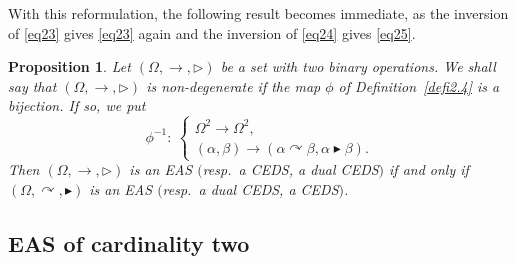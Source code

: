 \documentclass[10pt,a4paper]{amsart}
\numberwithin{equation}{section}
\newtheorem{Proposition}[Theorem]{Proposition}
 { \theoremstyle{definition}
\newtheorem{Definition}[Theorem]{Definition}
\newtheorem{Note}[Theorem]{Note}
\newtheorem{Example}[Theorem]{Example}
\newtheorem{Remark}[Theorem]{Remark}
\newtheorem{Notation}[Theorem]{Notation}}
\begin{document}
With this reformulation, the following result becomes immediate, as the
inversion of \eqref{eq23} gives \eqref{eq23} again and the inversion of \eqref{eq24} gives \eqref{eq25}.

\begin{Proposition}\label{prop2.7}
Let $(\Omega, \rightarrow,\triangleright)$ be a set with two binary operations. We shall say that $(\Omega,\rightarrow, \triangleright)$ is non-degenerate if the map $\phi$ of Definition~{\rm\ref{defi2.4}} is a bijection. If so, we put
\[\phi^{-1}\colon \ \begin{cases}
\Omega^2 \longrightarrow \Omega^2,\\
(\alpha,\beta) \longrightarrow (\alpha\curvearrowright \beta,\alpha \blacktriangleright \beta).
\end{cases}\]
Then $(\Omega,\rightarrow,\triangleright)$ is an EAS $($resp.\ a CEDS, a dual CEDS$)$ if and only if $(\Omega,\curvearrowright,\blacktriangleright)$ is an EAS $($resp.\ a dual CEDS, a CEDS$)$.
\end{Proposition}

\subsection{EAS of cardinality two}
\end{document}
